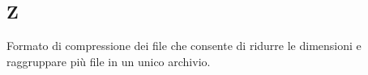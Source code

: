 \begin{center}
\section*{Z}
\end{center}

Formato di compressione dei file che consente di ridurre le dimensioni e raggruppare più file in un unico archivio.

